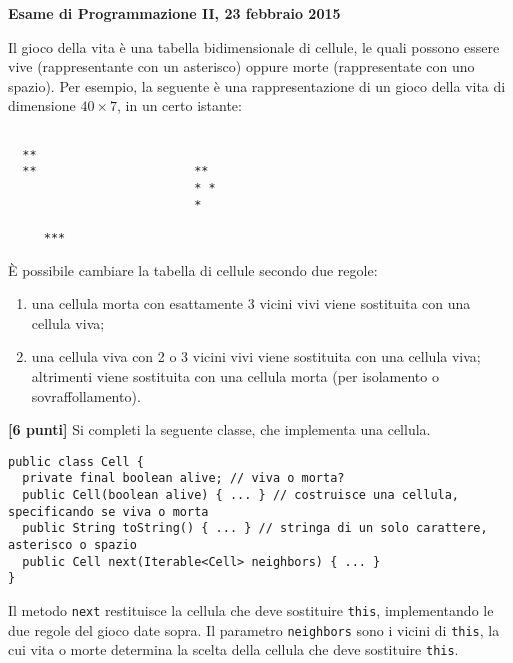 \documentclass{article}[10pt]
\newcounter{esnu}
\newenvironment{esercizio}{\medskip \noindent {\bf Esercizio\addtocounter{esnu}{1} \arabic{esnu}}}{}
\begin{document}
\begin{center} {\bf Esame di Programmazione II, 23 febbraio 2015}\end{center}

Il gioco della vita \`e una tabella bidimensionale di cellule, le quali possono essere vive
(rappresentante con un asterisco) oppure morte (rappresentate con uno spazio).
Per esempio, la seguente \`e una  rappresentazione di un gioco della vita di dimensione
$40\times 7$, in un certo istante:

{\small
\begin{verbatim}
                                        
  **                                    
  **                      **            
                          * *           
                          *             
                                        
     ***                                
\end{verbatim}}

\`E possibile cambiare la tabella di cellule secondo due regole:
%
\begin{enumerate}
\item una cellula morta con esattamente 3 vicini vivi viene sostituita con una cellula viva;
\item una cellula viva con 2 o 3 vicini vivi viene sostituita con una cellula viva;
      altrimenti viene sostituita con una cellula morta (per isolamento o sovraffollamento).
\end{enumerate}

\begin{esercizio}
\textbf{[6 punti]}
%
Si completi la seguente classe, che implementa una cellula.
%
{\small
\begin{verbatim}
public class Cell {
  private final boolean alive; // viva o morta?
  public Cell(boolean alive) { ... } // costruisce una cellula, specificando se viva o morta
  public String toString() { ... } // stringa di un solo carattere, asterisco o spazio
  public Cell next(Iterable<Cell> neighbors) { ... }
}
\end{verbatim}}

\noindent
Il metodo \texttt{next} restituisce la cellula che deve sostituire \texttt{this}, implementando le due
regole del gioco date sopra. Il parametro \texttt{neighbors} sono i vicini di \texttt{this},
la cui vita o morte determina la scelta della cellula che deve sostituire \texttt{this}.
\end{esercizio}
\end{document}

